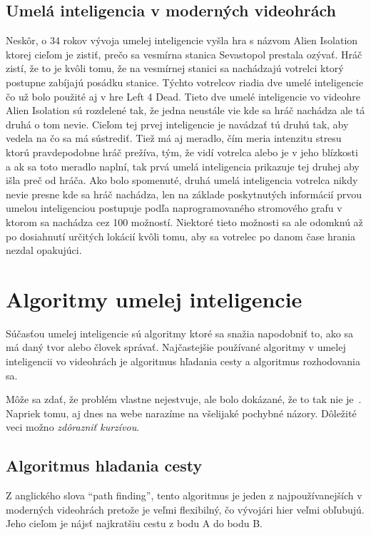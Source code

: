 \documentclass[10pt,twoside,slovak,a4paper]{article}
\begin{document}
\subsection{Umelá inteligencia v moderných videohrách} \label{kapitola2.3}
Neskôr, o 34 rokov vývoja umelej inteligencie vyšla hra s názvom Alien Isolation ktorej cieľom je zistiť, prečo sa vesmírna stanica Sevastopol prestala ozývať. Hráč zistí, že to je kvôli tomu, že na vesmírnej stanici sa nachádzajú votrelci ktorý postupne zabíjajú posádku stanice. Týchto votrelcov riadia dve umelé inteligencie čo už bolo použité aj v hre Left 4 Dead. Tieto dve umelé inteligencie vo videohre Alien Isolation sú rozdelené tak, že jedna neustále vie kde sa hráč nachádza ale tá druhá o tom nevie. Cieľom tej prvej inteligencie je navádzať tú druhú tak, aby vedela na čo sa má sústrediť. Tiež má aj meradlo, čím meria intenzitu stresu ktorú pravdepodobne hráč prežíva, tým, že vidí votrelca alebo je v jeho blízkosti a ak sa toto meradlo naplní, tak prvá umelá inteligencia prikazuje tej druhej aby išla preč od hráča. Ako bolo spomenuté, druhá umelá inteligencia votrelca nikdy nevie presne kde sa hráč nachádza, len na základe poskytnutých informácií prvou umelou inteligenciou postupuje podľa naprogramovaného stromového grafu v ktorom sa nachádza cez 100 možností. Niektoré tieto možnosti sa ale odomknú až po dosiahnutí určitých lokácií kvôli tomu, aby sa votrelec po danom čase hrania nezdal opakujúci.

\begin{figure*}[tbh]
\centering
\end{figure*}

\section{Algoritmy umelej inteligencie} \label{kapitola3}
Súčasťou umelej inteligencie sú algoritmy ktoré sa snažia napodobniť to, ako sa má daný tvor alebo človek správať. Najčastejšie používané algoritmy v umelej inteligencii vo videohrách je algoritmus hľadania cesty a algoritmus rozhodovania sa.


Môže sa zdať, že problém vlastne nejestvuje\cite{Coplien:MPD}, ale bolo dokázané, že to tak nie je~\cite{Czarnecki:Staged, Czarnecki:Progress}. Napriek tomu, aj dnes na webe narazíme na všelijaké pochybné názory\cite{PLP-Framework}. Dôležité veci možno \emph{zdôrazniť kurzívou}.


\subsection{Algoritmus hladania cesty} \label{kapitola3.1}
Z anglického slova “path finding”, tento algoritmus je jeden z najpoužívanejších v moderných videohrách pretože je veľmi flexibilný, čo vývojári hier veľmi obľubujú. Jeho cieľom je nájsť najkratšiu cestu z bodu A do bodu B. 
\end{document}
